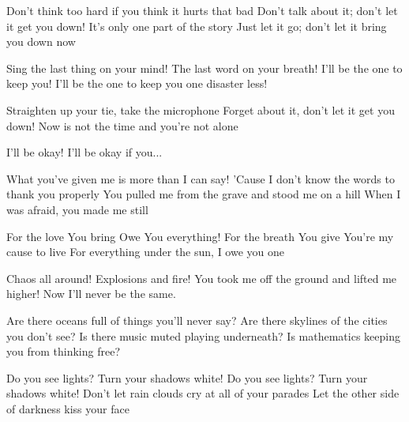 %
%
%
%


Don't think too hard if you think it hurts that bad
Don't talk about it; don't let it get you down!
It's only one part of the story
Just let it go; don't let it bring you down now

Sing the last thing on your mind!
The last word on your breath!
I'll be the one to keep you!
I'll be the one to keep you one disaster less!

Straighten up your tie, take the microphone
Forget about it, don't let it get you down!
Now is not the time and you're not alone

I'll be okay! I'll be okay if you...


What you've given me is more than I can say!
'Cause I don't know the words to thank you properly
You pulled me from the grave and stood me on a hill
When I was afraid, you made me still

For the love You bring
Owe You everything!
For the breath You give
You're my cause to live
For everything under the sun, I owe you one

Chaos all around! Explosions and fire!
You took me off the ground and lifted me higher!
Now I'll never be the same.


Are there oceans full of things you'll never say?
Are there skylines of the cities you don't see?
Is there music muted playing underneath?
Is mathematics keeping you from thinking free?

Do you see lights? Turn your shadows white!
Do you see lights?
Turn your shadows white!
Don't let rain clouds cry at all of your parades
Let the other side of darkness kiss your face

